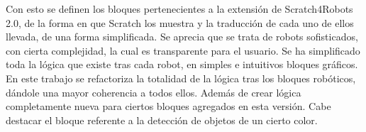 Con esto se definen los bloques pertenecientes a la extensión de Scratch4Robots 2.0, de la forma en que Scratch los muestra y la traducción de cada uno de ellos llevada, de una forma simplificada. Se aprecia que se trata de robots sofisticados, con cierta complejidad, la cual es transparente para el usuario. Se ha simplificado toda la lógica que existe tras cada robot, en simples e intuitivos bloques gráficos.\\

En este trabajo se refactoriza la totalidad de la lógica tras los bloques robóticos, dándole una mayor coherencia a todos ellos. Además de crear lógica completamente nueva para ciertos bloques agregados en esta versión. Cabe destacar el bloque referente a la detección de objetos de un cierto color.\\






